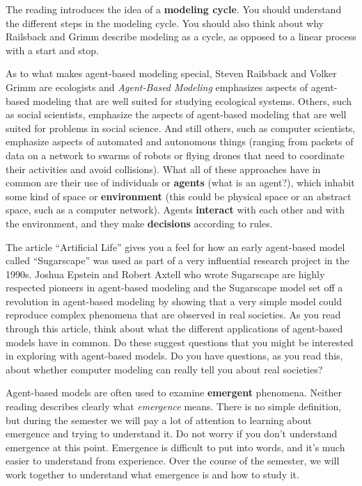 \documentclass[
]{article}
\begin{document}
The reading introduces the idea of a \textbf{modeling cycle}. You should
understand the different steps in the modeling cycle. You should also
think about why Railsback and Grimm describe modeling as a cycle, as
opposed to a linear process with a start and stop.

As to what makes agent-based modeling special, Steven Railsback and
Volker Grimm are ecologists and \emph{Agent-Based Modeling} emphasizes
aspects of agent-based modeling that are well suited for studying
ecological systems. Others, such as social scientists, emphasize the
aspects of agent-based modeling that are well suited for problems in
social science. And still others, such as computer scientists, emphasize
aspects of automated and autonomous things (ranging from packets of data
on a network to swarms of robots or flying drones that need to
coordinate their activities and avoid collisions). What all of these
approaches have in common are their use of individuals or
\textbf{agents} (what is an agent?), which inhabit some kind of space or
\textbf{environment} (this could be physical space or an abstract space,
such as a computer network). Agents \textbf{interact} with each other
and with the environment, and they make \textbf{decisions} according to
rules.

The article ``Artificial Life'' gives you a feel for how an early
agent-based model called ``Sugarscape'' was used as part of a very
influential research project in the 1990s. Joshua Epstein and Robert
Axtell who wrote Sugarscape are highly respected pioneers in agent-based
modeling and the Sugarscape model set off a revolution in agent-based
modeling by showing that a very simple model could reproduce complex
phenomena that are observed in real societies. As you read through this
article, think about what the different applications of agent-based
models have in common. Do these suggest questions that you might be
interested in exploring with agent-based models. Do you have questions,
as you read this, about whether computer modeling can really tell you
about real societies?

Agent-based models are often used to examine \textbf{emergent}
phenomena. Neither reading describes clearly what \emph{emergence}
means. There is no simple definition, but during the semester we will
pay a lot of attention to learning about emergence and trying to
understand it. Do not worry if you don't understand emergence at this
point. Emergence is difficult to put into words, and it's much easier to
understand from experience. Over the course of the semester, we will
work together to understand what emergence is and how to study it.
\end{document}
